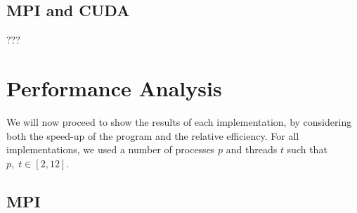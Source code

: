 \documentclass[11pt, journal]{IEEEtran}
\begin{document}
\subsection{MPI and CUDA}

???

\section{Performance Analysis}

We will now proceed to show the results of each implementation, by considering both the speed-up of the program and the relative efficiency. For all implementations, we used a number of processes $p$ and threads $t$ such that $p, \; t \in [2, 12]$. 

\subsection{MPI}
\end{document}
